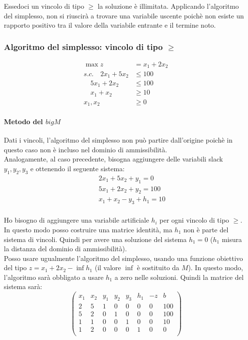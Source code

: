 \documentclass{article}
\begin{document}
Essedoci un vincolo di tipo $\geq$ la soluzione è illimitata.
Applicando l'algoritmo del simplesso, non si riuscirà a trovare una variabile 
uscente poichè non esiste un rapporto positivo tra il valore della variabile 
entrante e il termine noto.\\

\subsubsection{Algoritmo del simplesso: vincolo di tipo $\geq$}
\begin{align*}
  \max z &= x_1 + 2x_2 \\
  s.c. \quad 2x_1 + 5x_2 &\leq 100\\ 
  \quad 5x_1 + 2x_2 &\leq 100\\
  \quad x_1 + x_2 &\geq 10\\
  x_1, x_2 &\geq 0
\end{align*}

\paragraph{Metodo del $bigM$}
Dati i vincoli, l'algoritmo del simplesso non può partire dall'origine poichè 
in questo caso non è incluso nel dominio di ammissibilità.\\ Analogamente, al caso 
precedente, bisogna aggiungere delle variabili slack $y_1,y_2,y_3$ e ottenendo 
il seguente sistema:
\begin{align*}
  &\quad 2x_1 + 5x_2 + y_1 = 0\\ 
  &\quad 5x_1 + 2x_2 + y_2 = 100\\ 
  &\quad x_1 + x_2 - y_3 + h_1 = 10\\ 
\end{align*}

Ho bisogno di aggiungere una variabile artificiale $h_i$ per ogni vincolo di tipo 
$\geq$. In questo modo posso costruire una matrice identità, ma $h_1$ non è parte 
del sistema di vincoli. Quindi per avere una soluzione del sistema $h_1=0$ ($h_1$ 
misura la distanza del dominio di ammissibilità).\\ 
Posso usare ugualmente l'algoritmo del simplesso, usando una funzione obiettivo 
del tipo $z = x_1 + 2x_2 - \inf h_1$ (il valore $\inf$ è sostituito da $M$). 
In questo modo, l'algoritmo sarà obbligato a usare $h_1$ a zero nelle soluzioni. 
Quindi la matrice del sistema sarà:
\begin{equation*}
  \begin{pmatrix}
    x_1 & x_2 & y_1 & y_2 & y_3 & h_1 & -z & b\\
    2 & 5 & 1 & 0 & 0 & 0 & 0 & 100\\ 
    5 & 2 & 0 & 1 & 0 & 0 & 0 & 100\\ 
    1 & 1 & 0 & 0 & 1 & 0 & 0 & 10\\ 
    1 & 2 & 0 & 0 & 0 & 1 & 0 & 0\\ 
  \end{pmatrix}
\end{equation*}
\end{document}
